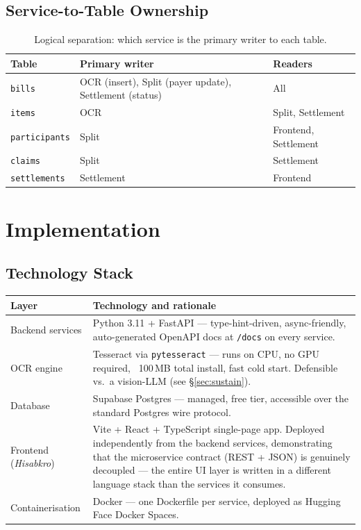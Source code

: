\documentclass[11pt, a4paper]{article}
\begin{document}
\subsection{Service-to-Table Ownership}

\begin{table}[h!]
\centering
\caption{Logical separation: which service is the primary writer to each table.}
\begin{tabularx}{\textwidth}{l l X}
\toprule
\textbf{Table} & \textbf{Primary writer} & \textbf{Readers} \\
\midrule
\texttt{bills}        & OCR (insert), Split (payer update), Settlement (status) & All \\
\texttt{items}        & OCR & Split, Settlement \\
\texttt{participants} & Split & Frontend, Settlement \\
\texttt{claims}       & Split & Settlement \\
\texttt{settlements}  & Settlement & Frontend \\
\bottomrule
\end{tabularx}
\end{table}

\section{Implementation}
\label{sec:impl}

\subsection{Technology Stack}

\begin{table}[h!]
\centering
\begin{tabularx}{\textwidth}{l X}
\toprule
\textbf{Layer} & \textbf{Technology and rationale} \\
\midrule
Backend services & Python 3.11 + FastAPI --- type-hint-driven, async-friendly, auto-generated OpenAPI docs at \texttt{/docs} on every service. \\
OCR engine & Tesseract via \texttt{pytesseract} --- runs on CPU, no GPU required, ~100\,MB total install, fast cold start. Defensible vs.\ a vision-LLM (see \S\ref{sec:sustain}). \\
Database & Supabase Postgres --- managed, free tier, accessible over the standard Postgres wire protocol. \\
Frontend (\textit{Hisabkro}) & Vite + React + TypeScript single-page app. Deployed independently from the backend services, demonstrating that the microservice contract (REST + JSON) is genuinely decoupled --- the entire UI layer is written in a different language stack than the services it consumes. \\
Containerisation & Docker --- one Dockerfile per service, deployed as Hugging Face Docker Spaces. \\
\bottomrule
\end{tabularx}
\end{table}
\end{document}
